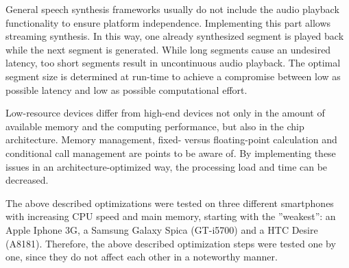 \begin{table}[h]
	\caption{Test settings of optimization approach B)~\cite{toth:optimizing}}
	\vspace{-0.75em}
	\label{tab:settings}
	\vspace{-1em}
\end{table}

General speech synthesis frameworks usually do not include the audio playback functionality to ensure platform independence. Implementing this part allows streaming synthesis. In this way, one already synthesized segment is played back while the next segment is generated. While long segments cause an undesired latency, too short segments result in uncontinuous audio playback. The optimal segment size is determined at run-time to achieve a compromise between low as possible latency and low as possible \break computational effort.

Low-resource devices differ from high-end devices not only in the amount of available memory and the computing performance, but also in the chip architecture. Memory management, fixed- versus floating-point calculation and conditional call management are points to be aware of. By implementing these issues in an architecture-optimized way, the processing load and time can be decreased.

The above described optimizations were tested on three different smartphones with increasing CPU speed and main memory, starting with the ''weakest'': an Apple Iphone 3G, a Samsung Galaxy Spica (GT-i5700) and a HTC Desire (A8181). Therefore, the above described optimization steps were tested one by one, since they do not affect each other in a noteworthy manner.

